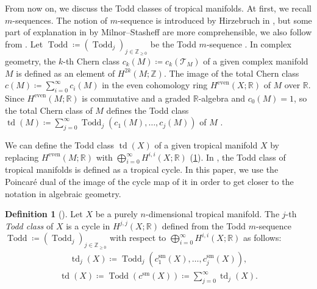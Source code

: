 \documentclass[a4paper,dvipdfmx,reqno,12pt]{amsart}
\theoremstyle{definition}
\newtheorem{definition}[theorem]{Definition}
\newcommand{\deq}{\coloneqq}
\newcommand{\opn}[1]{\operatorname{#1}}
\numberwithin{equation}{section}
\begin{document}
From now on, we discuss the Todd classes of
tropical manifolds.
At first, we recall $m$-sequences.
The notion of $m$-sequence is introduced
by Hirzebruch in \cite[]{MR1335917},
but some part of explanation in
\cite[]{MR440554}
by Milnor--Stasheff are more comprehensible,
we also follow from \cite[]{MR440554}.
Let $\opn{Todd}\deq 
(\opn{Todd}_j)_{j\in \mathbb{Z}_{\geq 0}}$ be 
the Todd $m$-sequence \cite[]{MR1335917}.
In complex geometry, the $k$-th Chern class
$c_k(M)\deq c_k(\mathcal{T}_M)$ of
a given complex manifold $M$ is defined
as an element of $H^{2k}(M;\mathbb{Z})$.
The image of the total Chern class 
$c(M)\deq \sum_{i=0}^{\infty}c_i(M)$
in the even cohomology ring $H^{\mathrm{even}}(X;\mathbb{R})$
of $M$ over $\mathbb{R}$.
Since $H^{\mathrm{even}}(M;\mathbb{R})$
is commutative and a graded $\mathbb{R}$-algebra
and $c_0(M)=1$,
so the total Chern class of $M$ defines 
the Todd class $\opn{td}(M)\deq \sum_{j=0}^{\infty}
\opn{Todd}_j(c_{1}(M),\ldots,c_{j}(M))$ of $M$
\cite[]{MR1335917}.
 
We can define the Todd class
$\opn{td}(X)$ of a given tropical manifold
$X$ by replacing 
$H^{\mathrm{even}}(M;\mathbb{R})$ with
$\bigoplus_{i=0}^{\infty} H^{i,i}(X;\mathbb{R})$
(\cref{definition-tropical-todd}).
In \cite[Conjecture 6.13]{demedrano2023chern},
the Todd class of tropical manifolds is
defined as a tropical cycle.
In this paper, we use the Poincar\'e dual of the image 
of the cycle map of it
in order to get closer to the notation 
in algebraic geometry.

\begin{definition}[{\cite[]{demedrano2023chern}}]
\label{definition-tropical-todd}
Let $X$ be a purely $n$-dimensional tropical manifold.
The $j$-th \emph{Todd class} of $X$ is
a cycle in $H^{j,j}(X;\mathbb{R})$
defined from 
the Todd $m$-sequence 
$\opn{Todd}\deq (\opn{Todd}_j)_{j\in \mathbb{Z}_{\geq 0}}$
with respect to $\bigoplus_{i=0}^{\infty}
H^{i,i}(X;\mathbb{R})$ as follows:
\begin{align}
\opn{td}_j(X)\deq \opn{Todd}_j(c_{1}^{\mathrm{sm}}(X),
\ldots,c_{j}^{\mathrm{sm}}(X)),
\end{align}
\begin{align}
\opn{td}(X)\deq
\opn{Todd}(c^{\mathrm{sm}}(X))\deq
\sum_{j=0}^{\infty}\opn{td}_j(X).
\end{align}

\end{definition}
\end{document}
